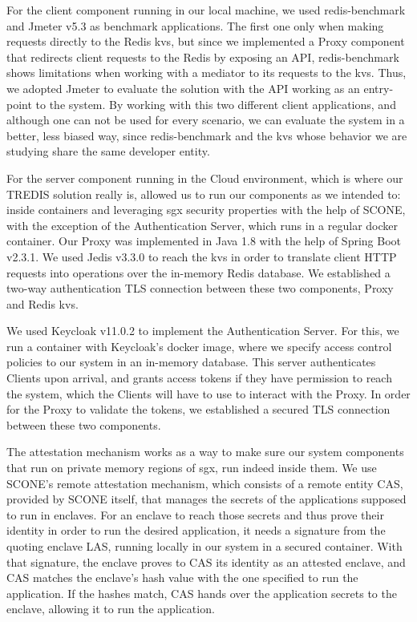 For the client component running in our local machine, we used redis-benchmark and Jmeter v5.3 as benchmark applications. 
The first one only when making requests directly to the Redis \gls{kvs}, but since we implemented a Proxy component that redirects client requests to the Redis by exposing an API, redis-benchmark shows limitations when working with a mediator to its requests to the \gls{kvs}. Thus, we adopted Jmeter to evaluate the solution with the API working as an entry-point to the system. By working with this two different client applications, and although one can not be used for every scenario, we can evaluate the system in a better, less biased way, since redis-benchmark and the \gls{kvs} whose behavior we are studying share the same developer entity.

For the server component running in the Cloud environment, which is where our TREDIS solution really is, allowed us to run our components as we intended to: inside containers and leveraging \gls{sgx} security properties with the help of SCONE, with the exception of the Authentication Server, which runs in a regular docker container. 
Our Proxy was implemented in Java 1.8 with the help of Spring Boot v2.3.1. We used Jedis v3.3.0 to reach the \gls{kvs} in order to translate client HTTP requests into operations over the in-memory Redis database. We established a two-way authentication TLS connection between these two components, Proxy and Redis \gls{kvs}.

We used Keycloak v11.0.2 to implement the Authentication Server. For this, we run a container with Keycloak's docker image, where we specify access control policies to our system in an in-memory database. This server authenticates Clients upon arrival, and grants access tokens if they have permission to reach the system, which the Clients will have to use to interact with the Proxy. In order for the Proxy to validate the tokens, we established a secured TLS connection between these two components.

The attestation mechanism works as a way to make sure our system components that run on private memory regions of \gls{sgx}, run indeed inside them. We use SCONE's remote attestation mechanism, which consists of a remote entity CAS, provided by SCONE itself, that manages the secrets of the applications supposed to run in enclaves. For an enclave to reach those secrets and thus prove their identity in order to run the desired application, it needs a signature from the quoting enclave LAS, running locally in our system in a secured container. With that signature, the enclave proves to CAS its identity as an attested enclave, and CAS matches the enclave's hash value with the one specified to run the application. If the hashes match, CAS hands over the application secrets to the enclave, allowing it to run the application.

